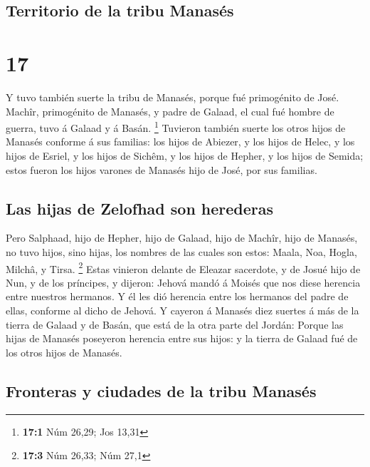 \hypertarget{territorio-de-la-tribu-manasuxe9s}{%
\subsection{Territorio de la tribu
Manasés}\label{territorio-de-la-tribu-manasuxe9s}}

\hypertarget{section-16}{%
\section{17}\label{section-16}}

 Y tuvo también suerte la tribu de Manasés, porque fué
primogénito de José. Machîr, primogénito de Manasés, y padre de Galaad,
el cual fué hombre de guerra, tuvo á Galaad y á Basán. \footnote{\textbf{17:1}
  Núm 26,29; Jos 13,31}  Tuvieron también suerte los otros
hijos de Manasés conforme á sus familias: los hijos de Abiezer, y los
hijos de Helec, y los hijos de Esriel, y los hijos de Sichêm, y los
hijos de Hepher, y los hijos de Semida; estos fueron los hijos varones
de Manasés hijo de José, por sus familias.

\hypertarget{las-hijas-de-zelofhad-son-herederas}{%
\subsection{Las hijas de Zelofhad son
herederas}\label{las-hijas-de-zelofhad-son-herederas}}

 Pero Salphaad, hijo de Hepher, hijo de Galaad, hijo de
Machîr, hijo de Manasés, no tuvo hijos, sino hijas, los nombres de las
cuales son estos: Maala, Noa, Hogla, Milchâ, y Tirsa. \footnote{\textbf{17:3}
  Núm 26,33; Núm 27,1}  Estas vinieron delante de Eleazar
sacerdote, y de Josué hijo de Nun, y de los príncipes, y dijeron: Jehová
mandó á Moisés que nos diese herencia entre nuestros hermanos. Y él les
dió herencia entre los hermanos del padre de ellas, conforme al dicho de
Jehová.  Y cayeron á Manasés diez suertes á más de la
tierra de Galaad y de Basán, que está de la otra parte del Jordán:
 Porque las hijas de Manasés poseyeron herencia entre sus
hijos: y la tierra de Galaad fué de los otros hijos de Manasés.

\hypertarget{fronteras-y-ciudades-de-la-tribu-manasuxe9s}{%
\subsection{Fronteras y ciudades de la tribu
Manasés}\label{fronteras-y-ciudades-de-la-tribu-manasuxe9s}}

